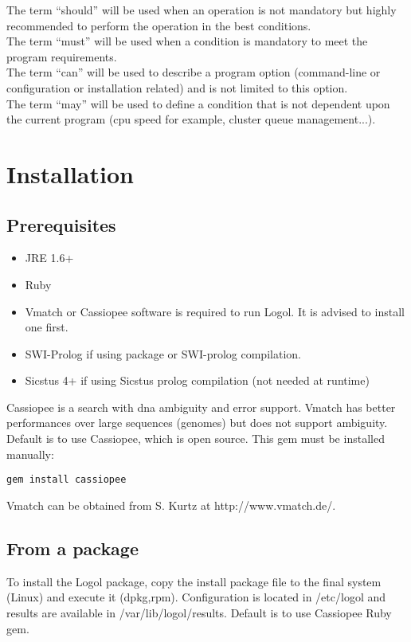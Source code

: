 \documentclass[11pt]{article}
\begin{document}
The term “should” will be used when an operation is not mandatory but highly recommended to perform the operation in the best conditions.\\
The term “must” will be used when a condition is mandatory to meet the program requirements.\\
The term “can” will be used to describe a program option (command-line or configuration or installation related) and is not limited to this option.\\
The term “may” will be used to define a condition that is not dependent upon the current program (cpu speed for example, cluster queue management...).

\section{Installation}

\subsection{Prerequisites}

\begin{itemize}
  \item JRE 1.6+
  \item Ruby
  \item Vmatch or Cassiopee software is required to run Logol. It is advised to install one first.
  \item SWI-Prolog if using package or SWI-prolog compilation.
  \item Sicstus 4+ if using Sicstus prolog compilation (not needed at runtime)
\end{itemize}
Cassiopee is a search with dna ambiguity and error support. Vmatch has better performances over large sequences (genomes) but does not support ambiguity.\\
Default is to use Cassiopee, which is open source. This gem must be installed manually:
\begin{verbatim}
gem install cassiopee
\end{verbatim}
Vmatch can be obtained from S. Kurtz at http://www.vmatch.de/.

\subsection{From a package}

To install the Logol package, copy the install package file to the final system (Linux) and execute  it (dpkg,rpm).
Configuration is located in /etc/logol and results are available in /var/lib/logol/results. Default is to use Cassiopee Ruby gem.
\end{document}
